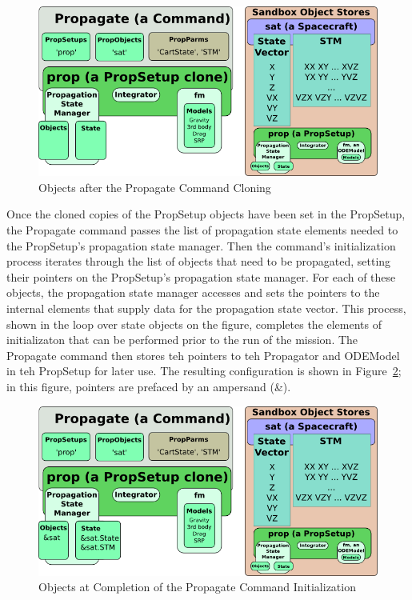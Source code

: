 \documentclass[10pt]{article}
\begin{document}
\begin{figure}[htb]
   \centering
   \includegraphics[372,186]{Images/PersistenceCloned.png}
   \caption{Objects after the Propagate Command Cloning}
   \label{fig:PersistenceCloned}
\end{figure}

Once the cloned copies of the PropSetup objects have been set in the PropSetup, the Propagate
command passes the list of propagation state elements needed to the PropSetup's propagation state
manager.  Then the command's initialization process iterates through the list of objects that need
to be propagated, setting their pointers on the PropSetup's propagation state manager.  For each of
these objects, the propagation state manager accesses and sets the pointers to the internal elements
that supply data for the propagation state vector.  This process, shown in the loop over state
objects on the figure, completes the elements of initializaton that can be performed prior to the
run of the mission.  The Propagate command then stores teh pointers to teh Propagator and ODEModel
in teh PropSetup for later use.  The resulting configuration is shown in
Figure~\ref{fig:PersistenceInitialized}; in this figure, pointers are prefaced by an ampersand (\&).

\begin{figure}[htb]
   \centering
   \includegraphics[372,186]{Images/PersistenceInitialized.png}
   \caption{Objects at Completion of the Propagate Command Initialization }
   \label{fig:PersistenceInitialized}
\end{figure}
\end{document}
